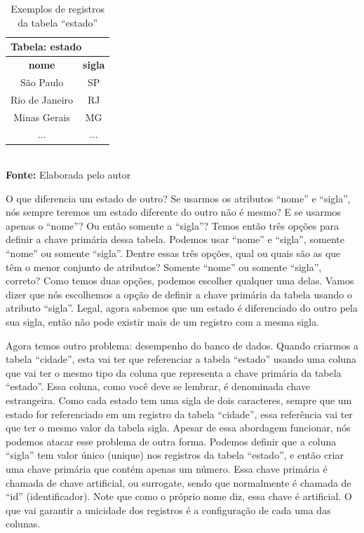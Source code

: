 \FloatBarrier
\begin{table}[ht]
    \centering
    \caption{Exemplos de registros da tabela ``estado''}
	\begin{tabular}{cc}
	    \hline
	    \multicolumn{2}{l}{\textbf{Tabela: estado}} \\ \hline
	    \textbf{nome}  &       \textbf{sigla}       \\ \hline
	      São Paulo    &             SP             \\ \hline
	    Rio de Janeiro &             RJ             \\ \hline
	     Minas Gerais  &             MG             \\ \hline
	         ...       &            ...             \\ \hline
	\end{tabular}
    \\ \vspace{0.2cm}
    \textbf{Fonte:} Elaborada pelo autor
    \label{tab:exemplosEstados}
\end{table}
\FloatBarrier

O que diferencia um estado de outro? Se usarmos os atributos ``nome'' e ``sigla'', nós sempre teremos um estado diferente do outro não é mesmo? E se usarmos apenas o ``nome''? Ou então somente a ``sigla''? Temos então três opções para definir a chave primária dessa tabela. Podemos usar ``nome'' e ``sigla'', somente ``nome'' ou somente ``sigla''. Dentre essas três opções, qual ou quais são as que têm o menor conjunto de atributos? Somente ``nome'' ou somente ``sigla'', correto? Como temos duas opções, podemos escolher qualquer uma delas. Vamos dizer que nós escolhemos a opção de definir a chave primária da tabela usando o atributo ``sigla''. Legal, agora sabemos que um estado é diferenciado do outro pela sua sigla, então não pode existir mais de um registro com a mesma sigla.

Agora temos outro problema: desempenho do banco de dados. Quando criarmos a tabela ``cidade'', esta vai ter que referenciar a tabela ``estado'' usando uma coluna que vai ter o mesmo tipo da coluna que representa a chave primária da tabela ``estado''. Essa coluna, como você deve se lembrar, é denominada chave estrangeira. Como cada estado tem uma sigla de dois caracteres, sempre que um estado for referenciado em um registro da tabela ``cidade'', essa referência vai ter que ter o mesmo valor da tabela sigla. Apesar de essa abordagem funcionar, nós podemos atacar esse problema de outra forma. Podemos definir que a coluna ``sigla'' tem valor único (unique) nos registros da tabela ``estado'', e então criar uma chave primária que contém apenas um número. Essa chave primária é chamada de chave artificial, ou surrogate, sendo que normalmente é chamada de ``id'' (identificador). Note que como o próprio nome diz, essa chave é artificial. O que vai garantir a unicidade dos registros é a configuração de cada uma das colunas. 

